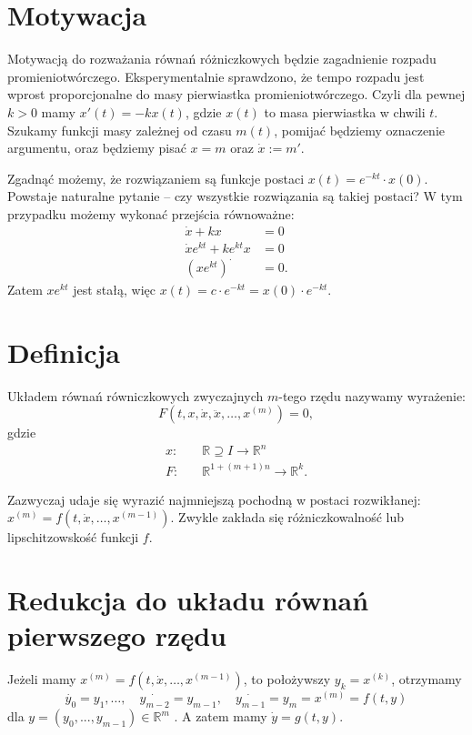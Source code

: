 ﻿\section{Motywacja}

Motywacją do rozważania równań różniczkowych będzie zagadnienie rozpadu promieniotwórczego.
Eksperymentalnie sprawdzono, że tempo rozpadu jest wprost proporcjonalne do masy pierwiastka promieniotwórczego.
Czyli dla pewnej $k>0$ mamy $x'(t)=-kx(t)$, gdzie $x\left(t \right) $ to masa pierwiastka w chwili $t$.
Szukamy funkcji masy zależnej od czasu $m(t)$, pomijać będziemy oznaczenie argumentu, oraz będziemy pisać $x = m$ oraz $\dot{x}:=m'$. 

Zgadnąć możemy, że rozwiązaniem są funkcje postaci $x\left( t \right) = e^{-kt}\cdot x\left( 0 \right) $. Powstaje naturalne pytanie -- czy wszystkie rozwiązania są takiej postaci? W tym przypadku możemy wykonać przejścia równoważne:
\begin{align*}
	\dot{x}+kx&=0\\
	\dot{x}e^{kt}+ke^{kt}x&=0\\
	\left( xe^{kt} \right) ^{\boldsymbol{\cdot}}&=0 
.\end{align*} Zatem $xe^{kt}$ jest stałą, więc $x\left( t \right) =c\cdot e^{-kt} = x(0)\cdot e^{-kt}$. 

\section{Definicja}
Układem równań równiczkowych zwyczajnych $m$-tego rzędu nazywamy wyrażenie: \[
	F\left(t,x,\dot{x},\ddot{x},\ldots,x^{(m)}\right)=0 
,\] gdzie 
\begin{align*}
	x: & \quad\mathbb{R}\supseteq I \to \mathbb{R}^{n}\\
	F:&  \quad\mathbb{R}^{1+\left( m+1 \right) n} \to \mathbb{R}^{k}
.\end{align*}

Zazwyczaj udaje się wyrazić najmniejszą pochodną w postaci rozwikłanej: $x^{\left( m \right) }=f\left( t, \dot{x}, \ldots, x^{\left( m-1 \right) } \right) $. Zwykle zakłada się różniczkowalność lub lipschitzowskość funkcji $f$. 

\section{Redukcja do układu równań pierwszego rzędu}

Jeżeli mamy $x^{\left( m \right) }=f\left(t,\dot{x},\ldots,x^{\left( m-1 \right) }\right)$, to położywszy $y_{k}=x^{(k)}$, otrzymamy $$\dot{y_{0}} = y_1, \ldots, \quad \dot{y_{m-2}}=y_{m-1}, \quad \dot{y_{m-1}}=y_m=x^{\left( m \right) }=f\left( t,y \right) $$ dla $y=\left( y_0,...,y_{m-1} \right) \in \mathbb{R}^{m}$ . 
A zatem mamy $\dot{y} = g\left( t,y \right) $.
